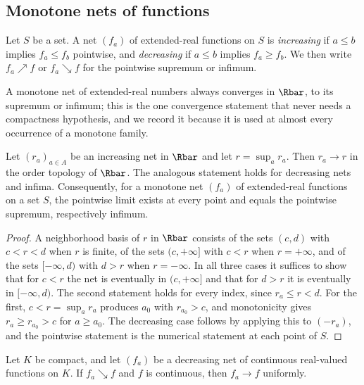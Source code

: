 \subsection{Monotone nets of functions}

Let $S$ be a set.  A net $(f_a)$ of extended-real functions on $S$ is
\emph{increasing} if $a\leq b$ implies $f_a\leq f_b$ pointwise, and
\emph{decreasing} if $a\leq b$ implies $f_a\geq f_b$.  We then write
$f_a\nearrow f$ or $f_a\searrow f$ for the pointwise supremum or infimum.

A monotone net of extended-real numbers always converges in $\Rbar$, to its
supremum or infimum; this is the one convergence statement that never needs a
compactness hypothesis, and we record it because it is used at almost every
occurrence of a monotone family.

\begin{lemma}\label{lem:monotone-net-converges}
Let $(r_a)_{a\in A}$ be an increasing net in $\Rbar$ and let $r=\sup_ar_a$.
Then $r_a\to r$ in the order topology of $\Rbar$.  The analogous statement
holds for decreasing nets and infima.  Consequently, for a monotone net
$(f_a)$ of extended-real functions on a set $S$, the pointwise limit exists at
every point and equals the pointwise supremum, respectively infimum.
\end{lemma}

\begin{proof}
A neighborhood basis of $r$ in $\Rbar$ consists of the sets $(c,d)$ with
$c<r<d$ when $r$ is finite, of the sets $(c,+\infty]$ with $c<r$ when
$r=+\infty$, and of the sets $[-\infty,d)$ with $d>r$ when $r=-\infty$.  In
all three cases it suffices to show that for $c<r$ the net is eventually in
$(c,+\infty]$ and that for $d>r$ it is eventually in $[-\infty,d)$.  The
second statement holds for every index, since $r_a\leq r<d$.  For the first,
$c<r=\sup_ar_a$ produces $a_0$ with $r_{a_0}>c$, and monotonicity gives
$r_a\geq r_{a_0}>c$ for $a\geq a_0$.  The decreasing case follows by applying
this to $(-r_a)$, and the pointwise statement is the numerical statement at
each point of $S$.
\end{proof}

\begin{proposition}\label{prop:dini-nets}
Let $K$ be compact, and let $(f_a)$ be a decreasing net of continuous
real-valued functions on $K$.  If $f_a\searrow f$ and $f$ is continuous,
then $f_a\to f$ uniformly.
\end{proposition}

